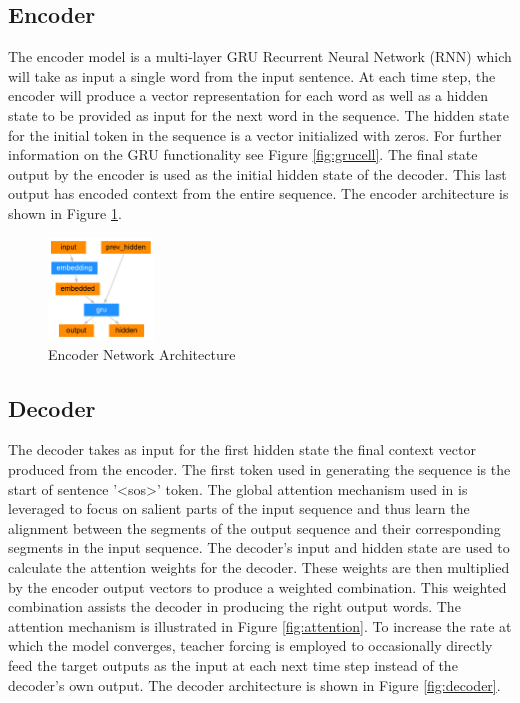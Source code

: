 \documentclass{sigchi}
\begin{document}
\subsection{Encoder}
The encoder model is a multi-layer GRU Recurrent Neural Network (RNN) which will take as input a single word from the input sentence. At each time step, the encoder will produce a vector representation for each word as well as a hidden state to be provided as input for the next word in the sequence. The hidden state for the initial token in the sequence is a vector initialized with zeros. For further information on the GRU functionality see Figure \ref{fig:grucell}. The final state output by the encoder is used as the initial hidden state of the decoder. This last output has encoded context from the entire sequence. The encoder architecture is shown in Figure \ref{fig:encoder}.

\begin{figure}[t]
\centering
\includegraphics[width=0.25\textwidth]{figures/encoder-network.png}
\caption{Encoder Network Architecture}
\label{fig:encoder}
\end{figure}

\subsection{Decoder}
The decoder takes as input for the first hidden state the final context vector produced from the encoder. The first token used in generating the sequence is the start of sentence '<sos>' token. The global attention mechanism used in \cite{alignandtranslate} is leveraged to focus on salient parts of the input sequence and thus learn the alignment between the segments of the output sequence and their corresponding segments in the input sequence. The decoder's input and hidden state are used to calculate the attention weights for the decoder. These weights are then multiplied by the encoder output vectors to produce a weighted combination. This weighted combination assists the decoder in producing the right output words. The attention mechanism is illustrated in Figure \ref{fig:attention}. To increase the rate at which the model converges, teacher forcing is employed to occasionally directly feed the target outputs as the input at each next time step instead of the decoder's own output. The decoder architecture is shown in Figure \ref{fig:decoder}.
\end{document}
